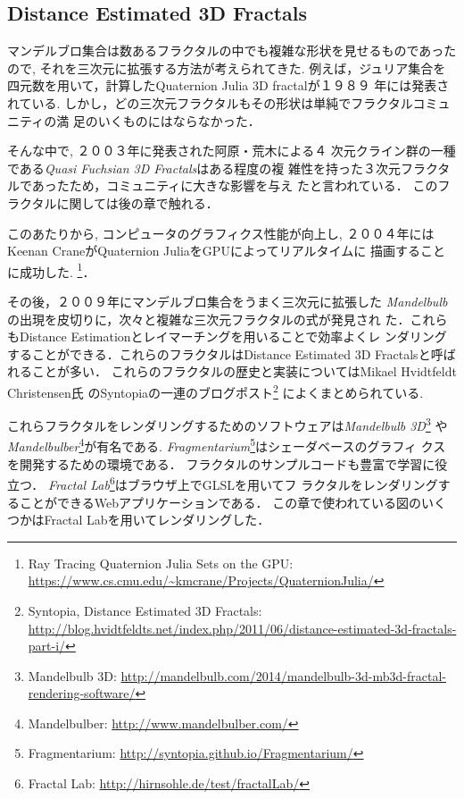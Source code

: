 \subsection{Distance Estimated 3D Fractals}

マンデルブロ集合は数あるフラクタルの中でも複雑な形状を見せるものであった
ので, それを三次元に拡張する方法が考えられてきた.
例えば，ジュリア集合を四元数を用いて，計算したQuaternion Julia 3D
fractal\cite{4djulia}が１９８９
年には発表されている.
しかし，どの三次元フラクタルもその形状は単純でフラクタルコミュニティの満
足のいくものにはならなかった．

そんな中で, ２００３年に発表された阿原・荒木\cite{sphairahedra}による４
次元クライン群の一種である{\it Quasi Fuchsian 3D Fractals}はある程度の複
雑性を持った３次元フラクタルであったため，コミュニティに大きな影響を与え
たと言われている．
このフラクタルに関しては後の章で触れる．

このあたりから, コンピュータのグラフィクス性能が向上し,
２００４年にはKeenan CraneがQuaternion JuliaをGPUによってリアルタイムに
描画することに成功した. \footnote{Ray Tracing Quaternion Julia Sets on
the GPU:
\url{https://www.cs.cmu.edu/~kmcrane/Projects/QuaternionJulia/}}．

その後，２００９年にマンデルブロ集合をうまく三次元に拡張した{\it
Mandelbulb}の出現を皮切りに，次々と複雑な三次元フラクタルの式が発見され
た．これらもDistance Estimationとレイマーチングを用いることで効率よくレ
ンダリングすることができる．これらのフラクタルはDistance Estimated 3D
Fractalsと呼ばれることが多い．
これらのフラクタルの歴史と実装についてはMikael Hvidtfeldt Christensen氏
のSyntopiaの一連のブログポスト\footnote{Syntopia, Distance Estimated 3D
Fractals:\\ \quad \quad
\url{http://blog.hvidtfeldts.net/index.php/2011/06/distance-estimated-3d-fractals-part-i/}}
によくまとめられている.

これらフラクタルをレンダリングするためのソフトウェアは{\it Mandelbulb
3D}\footnote{Mandelbulb 3D:
\url{http://mandelbulb.com/2014/mandelbulb-3d-mb3d-fractal-rendering-software/}}
や{\it Mandelbulber}\footnote{Mandelbulber:
\url{http://www.mandelbulber.com/}}が有名である.
{\it Fragmentarium}\footnote{Fragmentarium:
\url{http://syntopia.github.io/Fragmentarium/}}はシェーダベースのグラフィ
クスを開発するための環境である．
フラクタルのサンプルコードも豊富で学習に役立つ．
{\it Fractal Lab}\footnote{Fractal Lab:
\url{http://hirnsohle.de/test/fractalLab/}}はブラウザ上でGLSLを用いてフ
ラクタルをレンダリングすることができるWebアプリケーションである．
この章で使われている図のいくつかはFractal Labを用いてレンダリングした．


